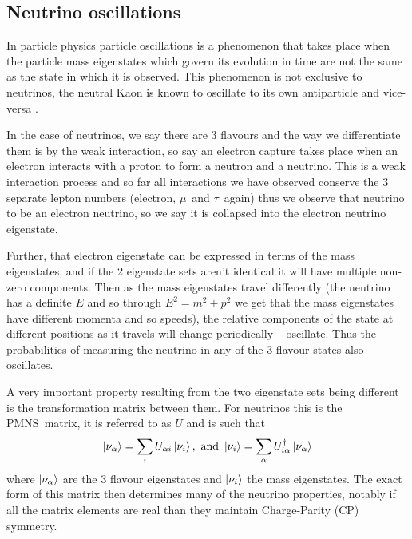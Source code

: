 \documentclass[a4paper,12pt]{article}
\newcommand{\Mu}{$\mu$}
\newcommand{\Tau}{$\tau$}
\begin{document}
\subsection{Neutrino oscillations}
In particle physics particle oscillations is a phenomenon that takes place when the particle mass eigenstates which govern its evolution in time are not the same as the state in which it is observed.
This phenomenon is not exclusive to neutrinos, the neutral Kaon is known to oscillate to its own antiparticle and vice-versa \cite{burkhardtWavelengthNeutrinoNeutral2003}.

In the case of neutrinos, we say there are 3 flavours and the way we differentiate them is by the weak interaction, so say an electron capture takes place when an electron interacts with a proton to form a neutron and a neutrino.
This is a weak interaction process and so far all interactions we have observed conserve the 3 separate lepton numbers (electron, \Mu\ and \Tau\ again) thus we observe that neutrino to be an electron neutrino, so we say it is collapsed into the electron neutrino eigenstate.

Further, that electron eigenstate can be expressed in terms of the mass eigenstates, and if the 2 eigenstate sets aren't identical it will have multiple non-zero components.
Then as the mass eigenstates travel differently (the neutrino has a definite $E$ and so through $E^2 = m^2 + p^2$ we get that the mass eigenstates have different momenta and so speeds), the relative components of the state at different positions as it travels will change periodically -- oscillate.
Thus the probabilities of measuring the neutrino in any of the 3 flavour states also oscillates.

A very important property resulting from the two eigenstate sets being different is the transformation matrix between them.
For neutrinos this is the PMNS\footnotemark\ matrix, it is referred to as $U$ and is such that 
\begin{equation}
    \ket{\nu_\alpha} = \sum_i U_{\alpha i} \ket{\nu_i}, \text{ and }
    \ket{\nu_i} = \sum_\alpha U^\dag_{i \alpha} \ket{\nu_\alpha}
\end{equation}
where $\ket{\nu_\alpha}$ are the 3 flavour eigenstates and $\ket{\nu_i}$ the mass eigenstates.
The exact form of this matrix then determines many of the neutrino properties, notably if all the matrix elements are real than they maintain Charge-Parity (CP) symmetry.
\end{document}
